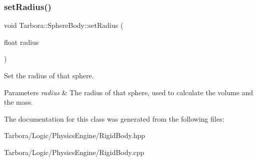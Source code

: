 \subsubsection{\texorpdfstring{set\+Radius()}{setRadius()}}
{\footnotesize\ttfamily void Tarbora\+::\+Sphere\+Body\+::set\+Radius (\begin{DoxyParamCaption}\item[{float}]{radius }\end{DoxyParamCaption})\hspace{0.3cm}{\ttfamily [inline]}}



Set the radius of that sphere. 


\begin{DoxyParams}{Parameters}
{\em radius} & The radius of that sphere, used to calculate the volume and the mass. \\
\hline
\end{DoxyParams}


The documentation for this class was generated from the following files\+:\begin{DoxyCompactItemize}
\item 
Tarbora/\+Logic/\+Physics\+Engine/Rigid\+Body.\+hpp\item 
Tarbora/\+Logic/\+Physics\+Engine/Rigid\+Body.\+cpp\end{DoxyCompactItemize}
